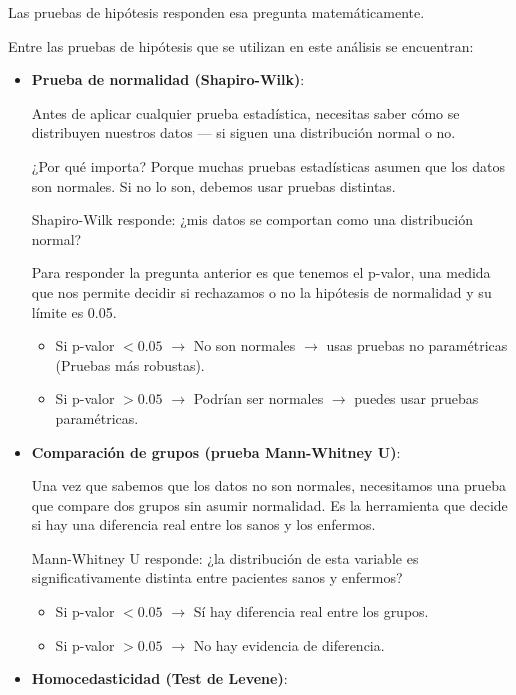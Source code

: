   Las pruebas de hipótesis responden esa pregunta matemáticamente.

  Entre las pruebas de hipótesis que se utilizan en este análisis se encuentran:

\begin{itemize}
    \item \textbf{Prueba de normalidad (Shapiro-Wilk)}:

    Antes de aplicar cualquier prueba estadística, necesitas saber cómo se distribuyen nuestros datos — si siguen una distribución normal o no.

    ¿Por qué importa? Porque muchas pruebas estadísticas asumen que los datos son normales. Si no lo son, debemos usar pruebas distintas.

    Shapiro-Wilk responde: ¿mis datos se comportan como una distribución normal?

    Para responder la pregunta anterior es que tenemos el p-valor, una medida que nos permite decidir si rechazamos o no la hipótesis de normalidad y su límite es 0.05.

    \begin{itemize}
        \item Si p-valor $< 0.05$ $\rightarrow$ No son normales $\rightarrow$ usas pruebas no paramétricas (Pruebas más robustas).
        \item Si p-valor $> 0.05$ $\rightarrow$ Podrían ser normales $\rightarrow$ puedes usar pruebas paramétricas.
    \end{itemize}


    \item \textbf{Comparación de grupos (prueba Mann-Whitney U)}:

    Una vez que sabemos que los datos no son normales, necesitamos una prueba que compare dos grupos sin asumir normalidad. Es la herramienta que decide si hay una diferencia real entre los sanos y los enfermos.

    Mann-Whitney U responde: ¿la distribución de esta variable es significativamente distinta entre pacientes sanos y enfermos?

    \begin{itemize}
        \item Si p-valor $< 0.05$ $\rightarrow$ Sí hay diferencia real entre los grupos.
        \item Si p-valor $> 0.05$ $\rightarrow$ No hay evidencia de diferencia.
    \end{itemize}

    \item \textbf{Homocedasticidad (Test de Levene)}:


\end{itemize}

